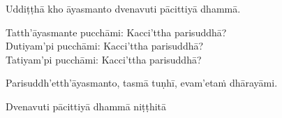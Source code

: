 \medskip

\begin{center}
	Uddiṭṭhā kho āyasmanto dvenavuti pācittiyā dhammā.

	\smallskip

	Tatth'āyasmante pucchāmi: Kacci'ttha parisuddhā?\\
	Dutiyam'pi pucchāmi: Kacci'ttha parisuddhā?\\
	Tatiyam'pi pucchāmi: Kacci'ttha parisuddhā?

	\smallskip

	Parisuddh'etth'āyasmanto, tasmā tuṇhī, evam'etaṁ dhārayāmi.\makeatletter\hyperlink{endnote437-appendix}\makeatother{}
\end{center}

\begin{outro}
	Dvenavuti pācittiyā dhammā niṭṭhitā
\end{outro}

\clearpage

